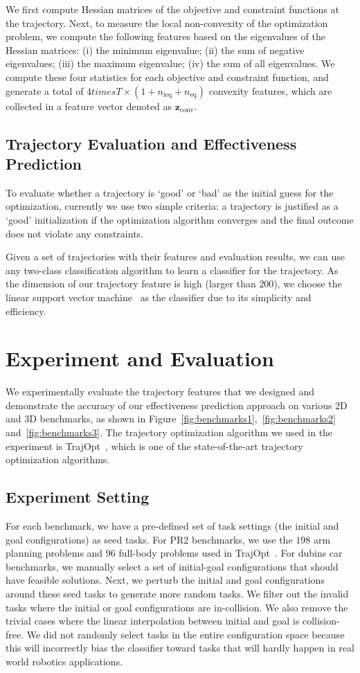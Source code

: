 \documentclass[letterpaper, 10 pt, conference]{ieeeconf}  %
\newcommand{\fconv}{\mbox{$\mathbf z_{\text{conv}}$}}
\begin{document}
We first compute Hessian matrices of the objective and constraint functions at the trajectory. Next, to measure the local non-convexity of the optimization problem, we compute the following features based on the eigenvalues of the Hessian matrices: (i) the minimum eigenvalue; (ii) the sum of negative eigenvalues; (iii) the maximum eigenvalue; (iv) the sum of all eigenvalues. We compute these four statistics for each objective and constraint function, and generate a total of $4 times T \times (1 + n_{\text{ieq}} + n_{\text{eq}})$ convexity features, which are collected in a feature vector denoted as $\fconv$.


\subsection{Trajectory Evaluation and Effectiveness Prediction}
To evaluate whether a trajectory is `good' or `bad' as the initial guess for the optimization, currently we use two simple criteria: a trajectory is justified as a `good' initialization if the optimization algorithm converges and the final outcome does not violate any constraints. 

Given a set of trajectories with their features and evaluation results, we can use any two-class classification algorithm to learn a classifier for the trajectory. As the dimension of our trajectory feature is high (larger than $200$), we choose the linear support vector machine~\cite{Cortes:1995:SN} as the classifier due to its simplicity and efficiency.

\section{Experiment and Evaluation}
\label{sec:experiment}
We experimentally evaluate the trajectory features that we designed and demonstrate the accuracy of our effectiveness prediction approach on various 2D and 3D benchmarks, as shown in Figure~\ref{fig:benchmarks1},~\ref{fig:benchmarks2} and~\ref{fig:benchmarks3}. The trajectory optimization algorithm we used in the experiment is TrajOpt~\cite{Schulman:2013:FLO}, which is one of the state-of-the-art trajectory optimization algorithms.

\subsection{Experiment Setting}
For each benchmark, we have a pre-defined set of task settings (the initial and goal configurations) as seed tasks. For PR2 benchmarks, we use the $198$ arm planning problems and $96$ full-body problems used in TrajOpt~\cite{Schulman:2013:FLO}. For dubins car benchmarks, we manually select a set of initial-goal configurations that should have feasible solutions. Next, we perturb the initial and goal configurations around these seed tasks to generate more random tasks. We filter out the invalid tasks where the initial or goal configurations are in-collision. We also remove the trivial cases where the linear interpolation between initial and goal is collision-free. We did not randomly select tasks in the entire configuration space because this will incorrectly bias the classifier toward tasks that will hardly happen in real world robotics applications.
\end{document}
